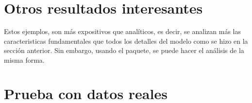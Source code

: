 \documentclass[../Main/Main.tex]{subfiles}
\begin{document}

\section{Otros resultados interesantes}
Estos ejemplos, son más expositivos que analíticos, es decir, se analizan más las caracteristicas fundamentales que todos los detalles del modelo como se hizo en la sección anterior. Sin embargo, usando el paquete, se puede hacer el análisis de la misma forma. 

\section{Prueba con datos reales}
\end{document}
